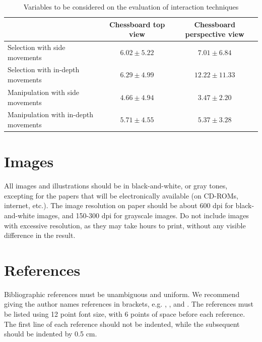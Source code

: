 \documentclass[12pt]{article}
\begin{document}
\begin{table}[ht]
\centering
\caption{Variables to be considered on the evaluation of interaction techniques}
\vspace{0.2cm}
\begin{tabular}{lcc}
\hline
& Chessboard top view & Chessboard perspective view \\
\hline
Selection with side movements & $6.02 \pm 5.22$ & $7.01 \pm 6.84$ \\
Selection with in-depth movements & $6.29 \pm 4.99$ & $12.22 \pm 11.33$ \\
Manipulation with side movements & $4.66 \pm 4.94$ & $3.47 \pm 2.20$ \\
Manipulation with in-depth movements & $5.71 \pm 4.55$ & $5.37 \pm 3.28$ \\
\hline
\end{tabular}
\end{table}

\section{Images}
All images and illustrations should be in black-and-white, or gray tones, excepting for the papers that will be electronically available (on CD-ROMs, internet, etc.). The image resolution on paper should be about 600 dpi for black-and-white images, and 150-300 dpi for grayscale images. Do not include images with excessive resolution, as they may take hours to print, without any visible difference in the result.

\section{References}
Bibliographic references must be unambiguous and uniform. We recommend giving the author names references in brackets, e.g. \cite{knuth:84}, \cite{boulic:91}, and \cite{smith:99}. The references must be listed using 12 point font size, with 6 points of space before each reference. The first line of each reference should not be indented, while the subsequent should be indented by 0.5 cm.



\end{document}
